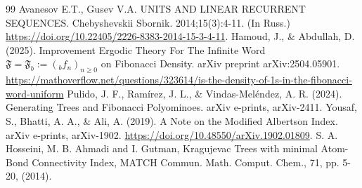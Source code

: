 \documentclass[12pt, a4paper]{article}
\begin{document}
\begin{thebibliography}{99}
\medskip
Avanesov E.T., Gusev V.A. UNITS AND LINEAR RECURRENT SEQUENCES. Chebyshevskii Sbornik. 2014;15(3):4-11. (In Russ.) \url{https://doi.org/10.22405/2226-8383-2014-15-3-4-11}.
\medskip
 Hamoud, J., \& Abdullah, D. (2025). Improvement Ergodic Theory For The Infinite Word $\mathfrak {F}=\mathfrak {F} _ {b}:=\left ({} _ {b} f_ {n}\right) _ {n\geqslant 0} $ on Fibonacci Density. arXiv preprint arXiv:2504.05901.
\medskip
 \hyperlink{https://mathoverflow.net/questions/323614/is-the-density-of-1s-in-the-fibonacci-word-uniform}{https://mathoverflow.net/questions/323614/is-the-density-of-1s-in-the-fibonacci-word-uniform}
\medskip
 Pulido, J. F., Ramírez, J. L., \& Vindas-Meléndez, A. R. (2024). Generating Trees and Fibonacci Polyominoes. arXiv e-prints, arXiv-2411.
\medskip
 Yousaf, S., Bhatti, A. A., \& Ali, A. (2019). A Note on the Modified Albertson Index. arXiv e-prints, arXiv-1902. \url{https://doi.org/10.48550/arXiv.1902.01809}.
\medskip
 S. A. Hosseini, M. B. Ahmadi and I. Gutman, Kragujevac Trees with minimal Atom-Bond Connectivity Index, MATCH Commun. Math. Comput. Chem., 71, pp. 5-20, (2014).
\medskip
\end{thebibliography}
\end{document}
